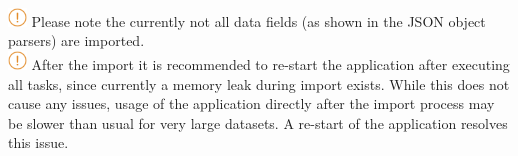 \includegraphics[width=0.5cm]{../../data/icons/hint.png} Please note the currently not all data fields (as shown in the JSON object parsers) are imported.\\

\includegraphics[width=0.5cm]{../../data/icons/hint.png} After the import it is recommended to re-start the application after executing all tasks, since currently a memory leak during import exists. While this does not cause any issues, usage of the application directly after the import process may be slower than usual for very large datasets. A re-start of the application resolves this issue. \\ 
